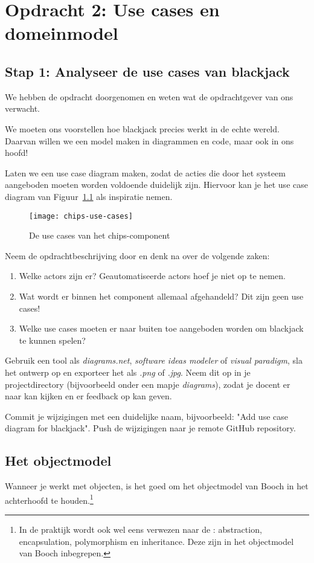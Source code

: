 \chapter{Opdracht 2: Use cases en domeinmodel}

\section{Stap 1: Analyseer de use cases van blackjack}
We hebben de opdracht doorgenomen en weten wat de opdrachtgever van ons verwacht.

We moeten ons voorstellen hoe blackjack precies werkt in de echte wereld.
Daarvan willen we een model maken in diagrammen en code, maar ook in ons hoofd!

Laten we een use case diagram maken, zodat de acties die door het systeem
aangeboden moeten worden voldoende duidelijk zijn. Hiervoor kan je het use case 
diagram van Figuur~\ref{fig:chips-use-cases} als inspiratie nemen.

\begin{figure}[H]
    \centering
    \texttt{[image: chips-use-cases]}
    \caption{De use cases van het chips-component}
    \label{fig:chips-use-cases}
\end{figure}

Neem de opdrachtbeschrijving door en denk na over de volgende zaken:
\begin{enumerate}
    \item Welke actors zijn er? Geautomatiseerde actors hoef je niet op te nemen.
    \item Wat wordt er binnen het component allemaal afgehandeld? Dit zijn geen use cases!
    \item Welke use cases moeten er naar buiten toe aangeboden worden om blackjack te kunnen spelen?
\end{enumerate}

Gebruik een tool als \textit{diagrams.net}, \textit{software ideas modeler} of \textit{visual paradigm},
sla het ontwerp op en exporteer het als \textit{.png} of \textit{.jpg}. 
Neem dit op in je projectdirectory (bijvoorbeeld onder een mapje \textit{diagrams}),
zodat je docent er naar kan kijken en er feedback op kan geven.

Commit je wijzigingen met een duidelijke naam, 
bijvoorbeeld: "Add use case diagram for blackjack". 
Push de wijzigingen naar je remote GitHub repository.

\section{Het objectmodel}
Wanneer je werkt met objecten, is het goed om het objectmodel van Booch in 
het achterhoofd te houden.\footnote{
    In de praktijk wordt ook wel eens verwezen naar de : 
    abstraction, encapsulation, polymorphism en inheritance. 
    Deze zijn in het objectmodel van Booch inbegrepen.
}

